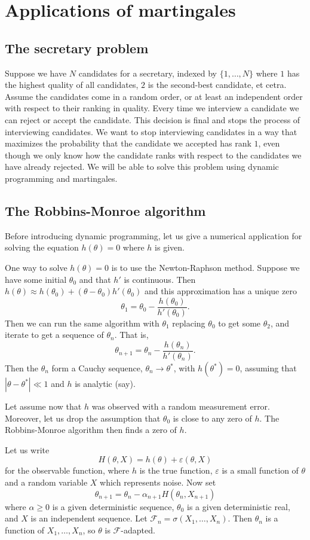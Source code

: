 \documentclass[12pt]{book}
\theoremstyle{definition}
\begin{document}
\chapter{Applications of martingales}
\section{The secretary problem}
Suppose we have $N$ candidates for a secretary, indexed by $\{1, \dots, N\}$ where $1$ has the highest quality of all candidates, $2$ is the second-best candidate, et cetra.
Assume the candidates come in a random order, or at least an independent order with respect to their ranking in quality.
Every time we interview a candidate we can reject or accept the candidate.
This decision is final and stops the process of interviewing candidates.
We want to stop interviewing candidates in a way that maximizes the probability that the candidate we accepted has rank $1$, even though we only know how the candidate ranks with respect to the candidates we have already rejected.
We will be able to solve this problem using dynamic programming and martingales.

\section{The Robbins-Monroe algorithm}
Before introducing dynamic programming, let us give a numerical application for solving the equation $h(\theta) = 0$ where $h$ is given.

One way to solve $h(\theta) = 0$ is to use the Newton-Raphson method.
Suppose we have some initial $\theta_0$ and that $h'$ is continuous.
Then $h(\theta) \approx h(\theta_0) + (\theta - \theta_0)h'(\theta_0)$ and this approximation has a unique zero
$$\theta_1 = \theta_0 - \frac{h(\theta_0)}{h'(\theta_0)}.$$
Then we can run the same algorithm with $\theta_1$ replacing $\theta_0$ to get some $\theta_2$, and iterate to get a sequence of $\theta_n$.
That is,
$$\theta_{n+1} = \theta_n - \frac{h(\theta_n)}{h'(\theta_n)}.$$
Then the $\theta_n$ form a Cauchy sequence, $\theta_n \to \theta^*$, with $h(\theta^*) = 0$, assuming that $|\theta - \theta^*| \ll 1$ and $h$ is analytic (say).

Let assume now that $h$ was observed with a random measurement error.
Moreover, let us drop the assumption that $\theta_0$ is close to any zero of $h$.
The Robbins-Monroe algorithm then finds a zero of $h$.

Let us write
$$H(\theta, X) = h(\theta) + \varepsilon(\theta, X)$$
for the observable function, where $h$ is the true function, $\varepsilon$ is a small function of $\theta$ and a random variable $X$ which represents noise.
Now set
$$\theta_{n+1} = \theta_n - \alpha_{n+1} H(\theta_n, X_{n+1})$$
where $\alpha \geq 0$ is a given deterministic sequence, $\theta_0$ is a given deterministic real, and $X$ is an independent sequence.
Let $\mathcal F_n = \sigma(X_1, \dots, X_n)$.
Then $\theta_n$ is a function of $X_1, \dots, X_n$, so $\theta$ is $\mathcal F$-adapted.
\end{document}
